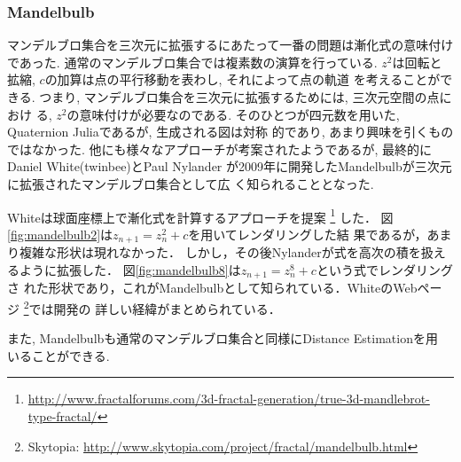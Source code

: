 \subsubsection{Mandelbulb}

マンデルブロ集合を三次元に拡張するにあたって一番の問題は漸化式の意味付けであった.
通常のマンデルブロ集合では複素数の演算を行っている.
$z^2$は回転と拡縮, $c$の加算は点の平行移動を表わし, それによって点の軌道
を考えることができる.
つまり, マンデルブロ集合を三次元に拡張するためには, 三次元空間の点におけ
る, $z^2$の意味付けが必要なのである.
そのひとつが四元数を用いた, Quaternion Juliaであるが, 生成される図は対称
的であり, あまり興味を引くものではなかった.
他にも様々なアプローチが考案されたようであるが, 最終的にDaniel
White(twinbee)とPaul Nylander
が2009年に開発したMandelbulbが三次元に拡張されたマンデルブロ集合として広
く知られることとなった.

Whiteは球面座標上で漸化式を計算するアプローチを提案
\footnote{\url{http://www.fractalforums.com/3d-fractal-generation/true-3d-mandlebrot-type-fractal/}}
した．
図\ref{fig:mandelbulb2}は$z_{n+1} = z_n^2 + c$を用いてレンダリングした結
果であるが，あまり複雑な形状は現れなかった．
しかし，その後Nylanderが式を高次の積を扱えるように拡張した．
図\ref{fig:mandelbulb8}は$z_{n+1} = z_n^8 + c $という式でレンダリングさ
れた形状であり，これがMandelbulbとして知られている．WhiteのWebページ
\footnote{Skytopia:
\url{http://www.skytopia.com/project/fractal/mandelbulb.html}}では開発の
詳しい経緯がまとめられている．

また, Mandelbulbも通常のマンデルブロ集合と同様にDistance Estimationを用
いることができる.

